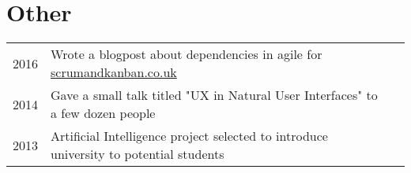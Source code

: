 \documentclass[letterpaper]{deedy-resume} %
\begin{document}
\begin{minipage}[t]{0.66\textwidth}
\sectionspace %


\section{Other}

\begin{tabular}{rll}
2016 & Wrote a blogpost about dependencies in agile for \href{http://scrumandkanban.co.uk/how-to-deal-with-dependencies/}{scrumandkanban.co.uk} \\
2014 & Gave a small talk titled "UX in Natural User Interfaces" to a few dozen people \\
2013 & Artificial Intelligence project selected to introduce university to potential students
\end{tabular}

\sectionspace %

\end{minipage} %
\end{document}
